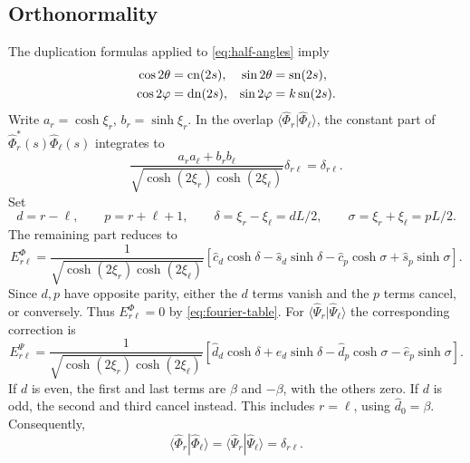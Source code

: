 \subsection{Orthonormality}
The duplication formulas applied to \eqref{eq:half-angles} imply
\begin{equation}
  \begin{aligned}
    \cos2\theta&=\operatorname{cn}(2s),&\sin2\theta&=\operatorname{sn}(2s),\\
    \cos2\varphi&=\operatorname{dn}(2s),&\sin2\varphi&=k\operatorname{sn}(2s).
  \end{aligned}
\end{equation}
Write $a_r=\cosh\xi_r$, $b_r=\sinh\xi_r$. In the overlap
$\langle\hat{\Phi}_r|\hat{\Phi}_\ell\rangle$, the constant part of
$\hat{\Phi}^*_r(s)\hat{\Phi}_\ell(s)$ integrates to
\begin{equation}
  \frac{a_ra_\ell+b_rb_\ell}
  {\sqrt{\cosh(2\xi_r)\cosh(2\xi_\ell)}}\delta_{r\ell}
  =\delta_{r\ell}.
\end{equation}
Set
\begin{equation}
  d=r-\ell,\qquad p=r+\ell+1,\qquad
  \delta=\xi_r-\xi_\ell=dL/2,\qquad
  \sigma=\xi_r+\xi_\ell=pL/2.
\end{equation}
The remaining part reduces to
\begin{equation}
  E^{\Phi}_{r\ell}=\frac1{\sqrt{\cosh(2\xi_r)\cosh(2\xi_\ell)}}\left[
    \widehat c_d\cosh\delta-\widehat s_d\sinh\delta
    -\widehat c_p\cosh\sigma+\widehat s_p\sinh\sigma\right].
\end{equation}
Since $d,p$ have opposite parity, either the $d$ terms vanish and the $p$ terms
cancel, or conversely. Thus $E^{\Phi}_{r\ell}=0$ by \eqref{eq:fourier-table}.
For $\langle\hat{\Psi}_r|\hat{\Psi}_\ell\rangle$ the corresponding correction is
\begin{equation}
  E^{\Psi}_{r\ell}=\frac1{\sqrt{\cosh(2\xi_r)\cosh(2\xi_\ell)}}\left[
    \widehat d_d\cosh\delta+\widehat e_d\sinh\delta
    -\widehat d_p\cosh\sigma-\widehat e_p\sinh\sigma\right].
\end{equation}
If $d$ is even, the first and last terms are $\beta$ and $-\beta$, with the
others zero. If $d$ is odd, the second and third cancel instead. This includes
$r=\ell$, using $\widehat d_0=\beta$. Consequently,
\begin{equation}
  \langle\hat{\Phi}_r|\hat{\Phi}_\ell\rangle
  =\langle\hat{\Psi}_r|\hat{\Psi}_\ell\rangle
  =\delta_{r\ell}.
  \label{eq:mode-orthogonality}
\end{equation}

